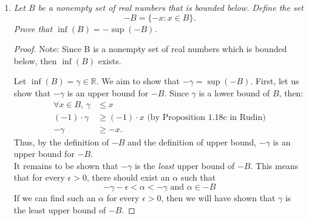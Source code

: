 \documentclass{amsart}
\begin{document}
\begin{enumerate}[1.]
\begin{proof}
\end{proof}
(b) The statement "$\gamma<\psi$ is \emph{always} true" is false.
\begin{proof}
Note: $S$ is on ordered set, so $S$ has the trichotomy property. \\
Consider, for example, $a\in S$ and $X = \{a\}$. Note that $X$ is non-empty.
Additionally, consider that $\gamma = a$ and $\psi = a$.
By definition of lower bound, $\gamma$ is a lower bound of X.
And by definition of upper bound, $\psi$ is an upper bound of X.
We can see by transitivity of equality:
\begin{align*}
    \gamma &= a = \psi \\
    \text{so } \gamma &= \psi
\end{align*}
By the trichotomy property, $ \gamma \nless \psi$.
\end{proof}

\newpage

\item \emph{Let $B$ be a nonempty set of real numbers that is bounded below. Define the set 
\[ -B = \{ -x : x \in B \}.\]
Prove that $\inf(B) = -\sup(-B)$.}
\begin{proof}
Note: Since B is a nonempty set of real numbers which is bounded below,
then $\inf(B)$ exists.

Let $\inf(B) = \gamma\in\mathbb{R}$. We aim to show that $-\gamma = \sup(-B)$.
First, let us show that $-\gamma$ is an upper bound for $-B$.
Since $\gamma$ is a lower bound of $B$, then:
\begin{align*}
    \forall x\in B \text{, } \gamma &\leq x \\
    (-1)\cdot\gamma &\geq (-1)\cdot x \text{ (by Proposition 1.18c in Rudin)} \\
    -\gamma &\geq -x.
\end{align*} 
Thus, by the definition of $-B$ and the definition of upper bound,
$-\gamma$ is an upper bound for $-B$. \\

It remains to be shown that $-\gamma$ is the \emph{least} upper bound of $-B$.
This means that for every $\epsilon > 0$, there should exist an $\alpha$ such that
\[
    -\gamma -\epsilon < \alpha < -\gamma \text{ and }\alpha \in -B
\]
If we can find such an $\alpha$ for every $\epsilon>0$,
then we will have shown that $\gamma$ is the least upper bound 
of $-B$.


\end{proof}
\end{enumerate}
\end{document}
